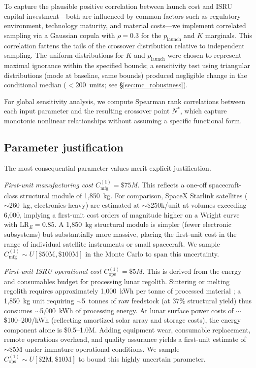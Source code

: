 \documentclass[preprint,12pt]{elsarticle}
\begin{document}
To capture the plausible positive correlation between launch cost and ISRU capital investment---both are influenced by common factors such as regulatory environment, technology maturity, and material costs---we implement correlated sampling via a Gaussian copula with $\rho = 0.3$ for the $p_{\mathrm{launch}}$ and $K$ marginals. This correlation fattens the tails of the crossover distribution relative to independent sampling. The uniform distributions for $K$ and $p_{\mathrm{launch}}$ were chosen to represent maximal ignorance within the specified bounds; a sensitivity test using triangular distributions (mode at baseline, same bounds) produced negligible change in the conditional median ($<200$~units; see \S\ref{sec:mc_robustness}).

For global sensitivity analysis, we compute Spearman rank correlations between each input parameter and the resulting crossover point $N^*$, which capture monotonic nonlinear relationships without assuming a specific functional form.

\subsection{Parameter justification}
\label{sec:param_justification}

The most consequential parameter values merit explicit justification.

\emph{First-unit manufacturing cost $C_{\mathrm{mfg}}^{(1)} = \$75$M.} This reflects a one-off spacecraft-class structural module of 1{,}850~kg. For comparison, SpaceX Starlink satellites ($\sim$260~kg, electronics-heavy) are estimated at $\sim$\$250k/unit at volumes exceeding 6{,}000, implying a first-unit cost orders of magnitude higher on a Wright curve with $\mathrm{LR}_E = 0.85$. A 1{,}850~kg structural module is simpler (fewer electronic subsystems) but substantially more massive, placing the first-unit cost in the range of individual satellite instruments or small spacecraft. We sample $C_{\mathrm{mfg}}^{(1)} \sim U[\$50\text{M}, \$100\text{M}]$ in the Monte Carlo to span this uncertainty.

\emph{First-unit ISRU operational cost $C_{\mathrm{ops}}^{(1)} = \$5$M.} This is derived from the energy and consumables budget for processing lunar regolith. Sintering or melting regolith requires approximately 1{,}000~kWh per tonne of processed material \cite{cilliers2023}; a 1{,}850~kg unit requiring $\sim$5~tonnes of raw feedstock (at 37\% structural yield) thus consumes $\sim$5{,}000~kWh of processing energy. At lunar surface power costs of $\sim$\$100--200/kWh (reflecting amortized solar array and storage costs), the energy component alone is \$0.5--1.0M. Adding equipment wear, consumable replacement, remote operations overhead, and quality assurance yields a first-unit estimate of $\sim$\$5M under immature operational conditions. We sample $C_{\mathrm{ops}}^{(1)} \sim U[\$2\text{M}, \$10\text{M}]$ to bound this highly uncertain parameter.
\end{document}
